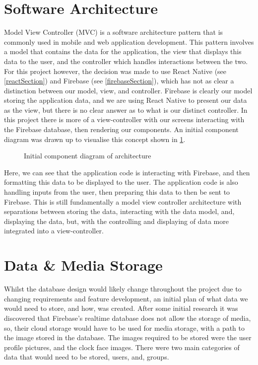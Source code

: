 \section{Software Architecture}
Model View Controller (MVC) \cite{mvc} is a software architecture pattern that is commonly used in mobile and web application development. This pattern involves a model that contains the data for the application, the view that displays this data to the user, and the controller which handles interactions between the two. For this project however, the decision was made to use React Native (see \ref{reactSection}) and Firebase (see \ref{firebaseSection}), which has not as clear a distinction between our model, view, and controller. Firebase is clearly our model storing the application data, and we are using React Native to present our data as the view, but there is no clear answer as to what is our distinct controller. In this project there is more of a view-controller with our screens interacting with the Firebase database, then rendering our components. An initial component diagram was drawn up to visualise this concept shown in \ref{fig:compDiag}.
\begin{figure}[!htbp]
    \centering
    \begin{subfigure}[b]{0.6\textwidth}
    \end{subfigure}
    \caption{Initial component diagram of architecture} 
    \label{fig:compDiag}
\end{figure}
\FloatBarrier
Here, we can see that the application code is interacting with Firebase, and then formatting this data to be displayed to the user. The application code is also handling inputs from the user, then preparing this data to then be sent to Firebase. This is still fundamentally a model view controller architecture with separations between storing the data, interacting with the data model, and, displaying the data, but, with the controlling and displaying of data more integrated into a view-controller.

\section{Data \& Media Storage}\label{dataMedStor}
Whilst the database design would likely change throughout the project due to changing requirements and feature development, an initial plan of what data we would need to store, and how, was created. After some initial research it was discovered that Firebase's realtime database does not allow the storage of media, so, their cloud storage would have to be used for media storage, with a path to the image stored in the database. The images required to be stored were the user profile pictures, and the clock face images. There were two main categories of data that would need to be stored, users, and, groups.

